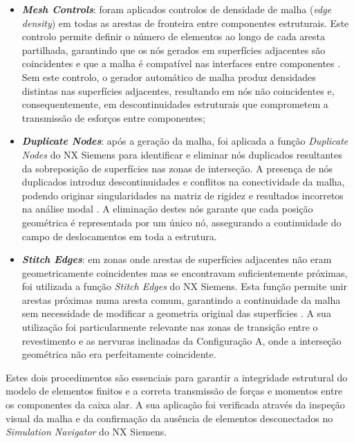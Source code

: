 \documentclass[11pt,oneside,a4paper,final]{report}
\begin{document}
\begin{itemize}
    \item \textbf{\textit{Mesh Controls}}: foram aplicados controlos de densidade de malha (\textit{edge density}) em todas as arestas de fronteira entre componentes estruturais. Este controlo permite definir o número de elementos ao longo de cada aresta partilhada, garantindo que os nós gerados em superfícies adjacentes são coincidentes e que a malha é compatível nas interfaces entre componentes \cite{Nastran2014, Bathe2014}. Sem este controlo, o gerador automático de malha produz densidades distintas nas superfícies adjacentes, resultando em nós não coincidentes e, consequentemente, em descontinuidades estruturais que comprometem a transmissão de esforços entre componentes;

    \item \textbf{\textit{Duplicate Nodes}}: após a geração da malha, foi aplicada a função \textit{Duplicate Nodes} do NX Siemens para identificar e eliminar nós duplicados resultantes da sobreposição de superfícies nas zonas de interseção. A presença de nós duplicados introduz descontinuidades e conflitos na conectividade da malha, podendo originar singularidades na matriz de rigidez e resultados incorretos na análise modal \cite{Bathe2014, Cook2001}. A eliminação destes nós garante que cada posição geométrica é representada por um único nó, assegurando a continuidade do campo de deslocamentos em toda a estrutura.
    
    \item \textbf{\textit{Stitch Edges}}: em zonas onde arestas de superfícies adjacentes não eram geometricamente coincidentes mas se encontravam suficientemente próximas, foi utilizada a função \textit{Stitch Edges} do NX Siemens. Esta função permite unir arestas próximas numa aresta comum, garantindo a continuidade da malha sem necessidade de modificar a geometria original das superfícies \cite{Nastran2014}. A sua utilização foi particularmente relevante nas zonas de transição entre o revestimento e as nervuras inclinadas da Configuração A, onde a interseção geométrica não era perfeitamente coincidente.

\end{itemize}

Estes dois procedimentos são essenciais para garantir a integridade estrutural do modelo de elementos finitos e a correta transmissão de forças e momentos entre os componentes da caixa alar. A sua aplicação foi verificada através da inspeção visual da malha e da confirmação da ausência de elementos desconectados no \textit{Simulation Navigator} do NX Siemens.
\end{document}
